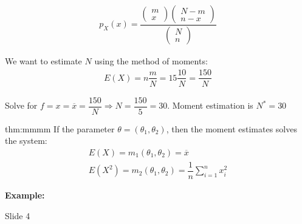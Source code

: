 \begin{equation*}
  \begin{gathered}
    p_X(x) = \dfrac{\begin{pmatrix}m\\x\end{pmatrix}\begin{pmatrix}N-m\\n-x\end{pmatrix}}{\begin{pmatrix}N\\n\end{pmatrix}}
  \end{gathered}
\end{equation*}\par
\noindent We want to estimate $N$ using the method of moments:
\begin{equation*}
  \begin{gathered}
    E(X) = n\dfrac{m}{N} = 15\dfrac{10}{N} = \dfrac{150}{N}
  \end{gathered}
\end{equation*}\par
\noindent Solve for $f = x = \overline{x} = \dfrac{150}{N}\Rightarrow N = \dfrac{150}{5} = 30$. Moment estimation is $N^* = 30$
\par\bigskip
\begin{theo}{thm:mmmm}
  If the parameter $\theta = (\theta_1,\theta_2)$, then the moment estimates solves the system:
  \begin{equation*}
    \begin{gathered}
      E(X) = m_1(\theta_1,\theta_2) = \overline{x}\\
      E(X^2) = m_2(\theta_1,\theta_2) = \dfrac{1}{n}\sum_{i=1}^{n}x_i^2
    \end{gathered}
  \end{equation*}
\end{theo}
\par\bigskip
\noindent\textbf{Example:}\par
\noindent Slide 4
\par\bigskip

